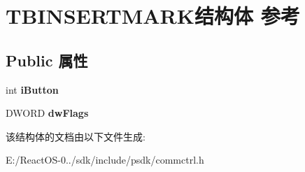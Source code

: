 \hypertarget{struct_t_b_i_n_s_e_r_t_m_a_r_k}{}\section{T\+B\+I\+N\+S\+E\+R\+T\+M\+A\+R\+K结构体 参考}
\label{struct_t_b_i_n_s_e_r_t_m_a_r_k}
\subsection*{Public 属性}
\begin{DoxyCompactItemize}
\item 
\mbox{\label{struct_t_b_i_n_s_e_r_t_m_a_r_k_a77dac287cbcc5d77b746bdd0faab7814}} 
int {\bfseries i\+Button}
\item 
\mbox{\label{struct_t_b_i_n_s_e_r_t_m_a_r_k_a5c603b807a667c3851f84c129953688f}} 
D\+W\+O\+RD {\bfseries dw\+Flags}
\end{DoxyCompactItemize}


该结构体的文档由以下文件生成\+:\begin{DoxyCompactItemize}
\item 
E\+:/\+React\+O\+S-\/0../sdk/include/psdk/commctrl.\+h\end{DoxyCompactItemize}
